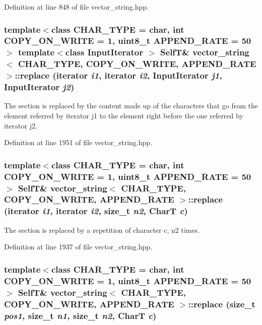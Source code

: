 Definition at line 848 of file vector\_\-string.hpp.\hypertarget{classvector__string_081f3ca5b6aa4391a5dc2316f2647073}{
\subsubsection[{replace}]{\setlength{\rightskip}{0pt plus 5cm}template$<$class CHAR\_\-TYPE  = char, int COPY\_\-ON\_\-WRITE = 1, uint8\_\-t APPEND\_\-RATE = 50$>$ template$<$class InputIterator $>$ {\bf SelfT}\& {\bf vector\_\-string}$<$ CHAR\_\-TYPE, COPY\_\-ON\_\-WRITE, APPEND\_\-RATE $>$::replace (iterator {\em i1}, \/  iterator {\em i2}, \/  InputIterator {\em j1}, \/  InputIterator {\em j2})}}
\label{classvector__string_081f3ca5b6aa4391a5dc2316f2647073}


The section is replaced by the content made up of the characters that go from the element referred by iterator j1 to the element right before the one referred by iterator j2. 

Definition at line 1951 of file vector\_\-string.hpp.\hypertarget{classvector__string_001d31babf69110da340488c9f37aec2}{
\subsubsection[{replace}]{\setlength{\rightskip}{0pt plus 5cm}template$<$class CHAR\_\-TYPE  = char, int COPY\_\-ON\_\-WRITE = 1, uint8\_\-t APPEND\_\-RATE = 50$>$ {\bf SelfT}\& {\bf vector\_\-string}$<$ CHAR\_\-TYPE, COPY\_\-ON\_\-WRITE, APPEND\_\-RATE $>$::replace (iterator {\em i1}, \/  iterator {\em i2}, \/  size\_\-t {\em n2}, \/  CharT {\em c})}}
\label{classvector__string_001d31babf69110da340488c9f37aec2}


The section is replaced by a repetition of character c, n2 times. 

Definition at line 1937 of file vector\_\-string.hpp.\hypertarget{classvector__string_00e7aaca1b2d5d06fbf58889de59b417}{
\subsubsection[{replace}]{\setlength{\rightskip}{0pt plus 5cm}template$<$class CHAR\_\-TYPE  = char, int COPY\_\-ON\_\-WRITE = 1, uint8\_\-t APPEND\_\-RATE = 50$>$ {\bf SelfT}\& {\bf vector\_\-string}$<$ CHAR\_\-TYPE, COPY\_\-ON\_\-WRITE, APPEND\_\-RATE $>$::replace (size\_\-t {\em pos1}, \/  size\_\-t {\em n1}, \/  size\_\-t {\em n2}, \/  CharT {\em c})}}
\label{classvector__string_00e7aaca1b2d5d06fbf58889de59b417}


